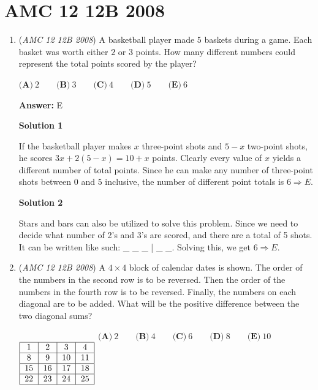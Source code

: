 \section{AMC 12 12B 2008}
        \begin{enumerate}
        	\item (\textit{AMC 12 12B 2008}) A basketball player made $5$ baskets during a game. Each basket was worth either $2$ or $3$ points. How many different numbers could represent the total points scored by the player?


 $\textbf{(A)}\ 2 \qquad \textbf{(B)}\ 3 \qquad \textbf{(C)}\ 4 \qquad \textbf{(D)}\ 5 \qquad \textbf{(E)}\ 6$

 \textbf{Answer: }E



\textbf{Solution 1}

If the basketball player makes $x$ three-point shots and $5-x$ two-point shots, he scores $3x+2(5-x)=10+x$ points. Clearly every value of $x$ yields a different number of total points. Since he can make any number of three-point shots between $0$ and $5$ inclusive, the number of different point totals is $6 \Rightarrow E$.

 



\textbf{Solution 2}

Stars and bars can also be utilized to solve this problem. Since we need to decide what number of 2's and 3's are scored, and there are a total of 5 shots. It can be written like such: \_ \_ \_ | \_ \_. Solving this, we get $6 \Rightarrow E$.

 


	\item (\textit{AMC 12 12B 2008}) A $4\times 4$ block of calendar dates is shown. The order of the numbers in the second row is to be reversed. Then the order of the numbers in the fourth row is to be reversed. Finally, the numbers on each diagonal are to be added. What will be the positive difference between the two diagonal sums?


 $\begin{tabular}[t]{|c|c|c|c|} \multicolumn{4}{c}{}\\\hline 1&2&3&4\\\hline 8&9&10&11\\\hline 15&16&17&18\\\hline 22&23&24&25\\\hline \end{tabular}$
$\textbf{(A)}\ 2 \qquad \textbf{(B)}\ 4 \qquad \textbf{(C)}\ 6 \qquad \textbf{(D)}\ 8 \qquad \textbf{(E)}\ 10$


\end{enumerate}
